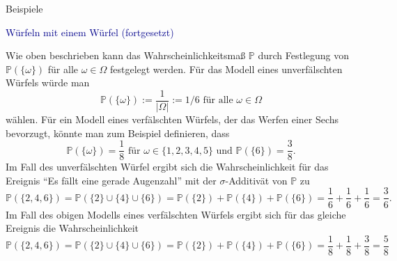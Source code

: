\documentclass[
  8pt,
  ignorenonframetext,
]{beamer}
\begin{document}
\begin{frame}{Beispiele}
\protect\hypertarget{beispiele-2}{}
\small

\textcolor{darkblue}{Würfeln mit einem Würfel (fortgesetzt)}
\footnotesize

Wie oben beschrieben kann das Wahrscheinlichkeitsmaß \(\mathbb{P}\)
durch Festlegung von \(\mathbb{P}(\{\omega\})\) für alle
\(\omega \in \Omega\) festgelegt werden. Für das Modell eines
unverfälschten Würfels würde man \begin{equation}
\mathbb{P}(\{\omega\}) := \frac{1}{|\Omega|} := 1/6 \mbox{ für alle } \omega \in \Omega
\end{equation} wählen. Für ein Modell eines verfälschten Würfels, der
das Werfen einer Sechs bevorzugt, könnte man zum Beispiel definieren,
dass \begin{equation}
\mathbb{P}(\{\omega\}) = \frac{1}{8} \mbox{ für } \omega \in \{1,2,3,4,5\}
\mbox{ und }
\mathbb{P}(\{6\}) = \frac{3}{8}.
\end{equation} Im Fall des unverfälschten Würfel ergibt sich die
Wahrscheinlichkeit für das Ereignis ``Es fällt eine gerade Augenzahl''
mit der \(\sigma\)-Additivät von \(\mathbb{P}\) zu \begin{equation}
\mathbb{P}(\{2,4,6\})
= \mathbb{P}(\{2\} \cup \{4\} \cup \{6\} )
= \mathbb{P}(\{2\}) + \mathbb{P}(\{4\}) + \mathbb{P}(\{6\})
= \frac{1}{6} + \frac{1}{6} +  \frac{1}{6}
= \frac{3}{6}.
\end{equation} Im Fall des obigen Modells eines verfälschten Würfels
ergibt sich für das gleiche Ereignis die Wahrscheinlichkeit
\begin{equation}
\mathbb{P}(\{2,4,6\})
= \mathbb{P}(\{2\} \cup \{4\} \cup \{6\} )
= \mathbb{P}(\{2\}) + \mathbb{P}(\{4\}) + \mathbb{P}(\{6\})
= \frac{1}{8} + \frac{1}{8} +  \frac{3}{8}
= \frac{5}{8}
\end{equation}
\end{frame}
\end{document}
